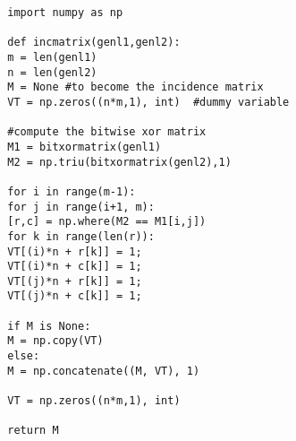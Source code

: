 \documentclass{article}
\begin{document}
	\begin{verbatim}
		import numpy as np
		
		def incmatrix(genl1,genl2):
		m = len(genl1)
		n = len(genl2)
		M = None #to become the incidence matrix
		VT = np.zeros((n*m,1), int)  #dummy variable
		
		#compute the bitwise xor matrix
		M1 = bitxormatrix(genl1)
		M2 = np.triu(bitxormatrix(genl2),1) 
		
		for i in range(m-1):
		for j in range(i+1, m):
		[r,c] = np.where(M2 == M1[i,j])
		for k in range(len(r)):
		VT[(i)*n + r[k]] = 1;
		VT[(i)*n + c[k]] = 1;
		VT[(j)*n + r[k]] = 1;
		VT[(j)*n + c[k]] = 1;
		
		if M is None:
		M = np.copy(VT)
		else:
		M = np.concatenate((M, VT), 1)
		
		VT = np.zeros((n*m,1), int)
		
		return M
	\end{verbatim}
\end{document}
